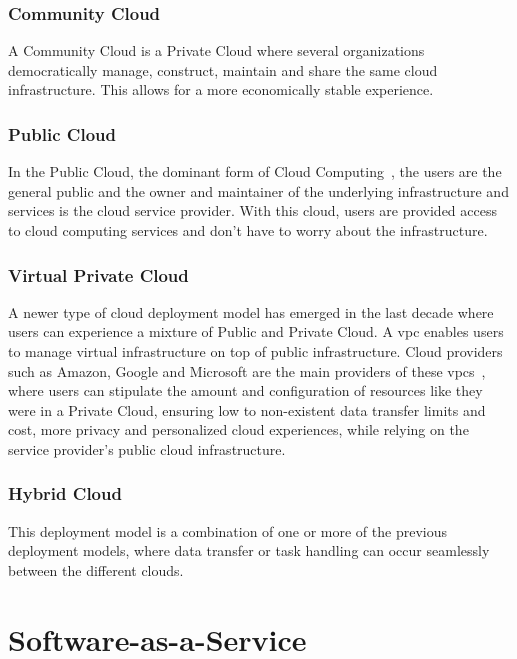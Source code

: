 \subsubsection{Community Cloud}\label{state-of-the-art:sss:community-cloud}
A Community Cloud is a Private Cloud where several organizations democratically manage, construct, maintain and share the same cloud infrastructure. This allows for a more economically stable experience.

\subsubsection{Public Cloud}\label{state-of-the-art:sss:public-cloud}
In the Public Cloud, the dominant form of Cloud Computing~\Parencite{dillon_tharam_and_wu_chen_and_chang_elizabeth}, the users are the general public and the owner and maintainer of the underlying infrastructure and services is the cloud service provider. With this cloud, users are provided access to cloud computing services and don't have to worry about the infrastructure.

\subsubsection{Virtual Private Cloud}\label{state-of-the-art:sss:virtual-private-cloud}
A newer type of cloud deployment model has emerged in the last decade where users can experience a mixture of Public and Private Cloud. A \gls{vpc} enables users to manage virtual infrastructure on top of public infrastructure. Cloud providers such as Amazon, Google and Microsoft are the main providers of these \gls{vpc}s~\Parencite{aljamal_el-mousa_jubair_2018}, where users can stipulate the amount and configuration of resources like they were in a Private Cloud, ensuring low to non-existent data transfer limits and cost, more privacy and personalized cloud experiences, while relying on the service provider's public cloud infrastructure.

\subsubsection{Hybrid Cloud}\label{state-of-the-art:sss:hybrid-cloud} 
This deployment model is a combination of one or more of the previous deployment models, where data transfer or task handling can occur seamlessly between the different clouds.

\section{Software-as-a-Service}\label{state-of-the-art:s:software-as-a-service}

